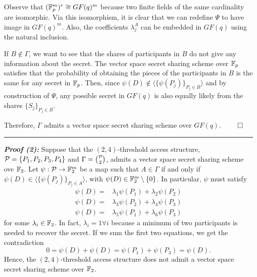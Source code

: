 Observe that $(\F_p^m)^r \cong GF(q)^m$ because two finite fields of the same cardinality are isomorphic.
Via this isomorphism, it is clear that we can redefine $\Psi$ to have image in $GF(q)^m$.
Also, the coefficients $\lambda^A_j$ can be embedded in $GF(q)$ using the natural inclusion.

If $B\not \in \Gamma$, we want to see that the shares of participants in $B$ do not give any information about the secret.
The vector space secret sharing scheme over $\F_p$ satisfies that the probability of obtaining the pieces of the participants in $B$ is the same for any secret in $\F_p$.
Then, since $\psi(D) \not \in \langle \{\psi(P_j)\}_{P_j\in B}\rangle$ and by construction of $\Psi$, any possible secret in $GF(q)$ is also equally likely from the shares $\{S_j\}_{P_j\in B}$. 

Therefore, $\Gamma$ admits a vector space secret sharing scheme over $GF(q)$. \hfill $\qed$

\begin{center}
    \rule{5cm}{0.4pt}
\end{center}

\textbf{\textit{Proof (2):}}
Suppose that the $(2,4)$-threshold access structure, $\P = \{P_1, P_2, P_3, P_4\}$ and $\Gamma = \binom{\P}{2}$,  admits a vector space secret sharing scheme ove $\F_2$.
Let $\psi: \P \to \F_2^m$ be a map such that $A\in\Gamma$ if and only if $\psi(D)\in\langle \{\psi(P_j)\}_{P_j\in A}\rangle$, with $\psi(D) \in \F_2^m\setminus\{0\}$.
In particular, $\psi$ must satisfy
\begin{equation*}
    \begin{split}
        \psi(D) = & \lambda_1\psi(P_1) + \lambda_2\psi(P_2)\\
        \psi(D) = & \lambda_3\psi(P_2) + \lambda_4\psi(P_3)\\
        \psi(D) = & \lambda_5\psi(P_1) + \lambda_6\psi(P_3)
    \end{split}
\end{equation*}
for some $\lambda_i \in \F_2$.
In fact, $\lambda_i = 1 \forall i$ because a minimum of two participants is needed to recover the secret.
If we sum the first two equations, we get the contradiction $$0 = \psi(D) + \psi(D) = \psi(P_1) + \psi(P_3) = \psi(D).$$
Hence, the $(2,4)$-threshold access structure does not admit a vector space secret sharing scheme over $\F_2$.

